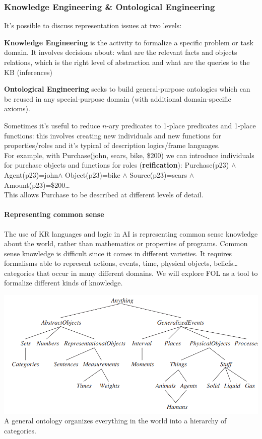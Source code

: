 \documentclass[10pt]{report}
\begin{document}
\subsubsection{Knowledge Engineering \& Ontological Engineering} It's possible to discuss representation issues at two levels:
\begin{list}{}{}
	\item \textbf{Knowledge Engineering} is the activity to formalize a specific problem or task domain. It involves decisions about: what are the relevant facts and objects relations, which is the right level of abstraction and what are the queries to the KB (inferences)
	\item \textbf{Ontological Engineering} seeks to build general-purpose ontologies which can be reused in any special-purpose domain (with additional domain-specific axioms).
\end{list}
Sometimes it's useful to reduce $n$-ary predicates to 1-place predicates and 1-place functions: this involves creating new individuals and new functions for properties/roles and it's typical of description logics/frame languages.\\
For example, with Purchase(john, sears, bike, \$200) we can introduce individuals for purchase objects and functions for roles (\textbf{reification}): Purchase(p23) $\wedge$ Agent(p23)=john$\wedge$ Object(p23)=bike $\wedge$ Source(p23)=sears $\wedge$ Amount(p23)=\$200\ldots\\
This allows Purchase to be described at different levels of detail.
\paragraph{Representing common sense} The use of KR languages and logic in AI is representing common sense knowledge about the world, rather than mathematics or properties of programs. Common sense knowledge is difficult since it comes in different varieties. It requires formalisms able to represent actions, events, time, physical objects, beliefs\ldots categories that occur in many different domains. We will explore FOL as a tool to formalize different kinds of knowledge.
\begin{center}
	\includegraphics[scale=0.5]{12.png}\\
	A general ontology organizes everything in the world into a hierarchy of categories.
\end{center}
\end{document}
